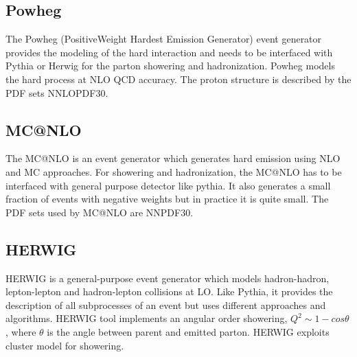 \subsection{Powheg}
The Powheg (PositiveWeight Hardest Emission Generator) event generator \cite{powheg} provides the modeling of the hard interaction and needs to be interfaced with Pythia or Herwig for the parton showering and hadronization. Powheg models the hard process at NLO QCD accuracy. The proton structure is described by the PDF sets NNLOPDF30.
\subsection{MC@NLO}
The MC@NLO \cite{mcanlo} is an event generator which generates hard emission using NLO and MC approaches. For showering and hadronization, the MC@NLO has to be interfaced with general purpose detector like pythia. It also generates a small fraction of events with negative weights but in practice it is quite small. The PDF sets used by MC@NLO are NNPDF30.
\subsection{HERWIG}\label{subsec:herwig}
HERWIG is a general-purpose event generator \cite{herwig} which models hadron-hadron, lepton-lepton and hadron-lepton collisions at LO. Like Pythia, it provides the description of all subprocesses of an event but uses different approaches and algorithms. HERWIG tool implements an angular order showering, $Q^{2} \sim 1 - cos\theta$, where $\theta$ is the angle between parent and emitted parton. HERWIG exploits cluster model for showering.
